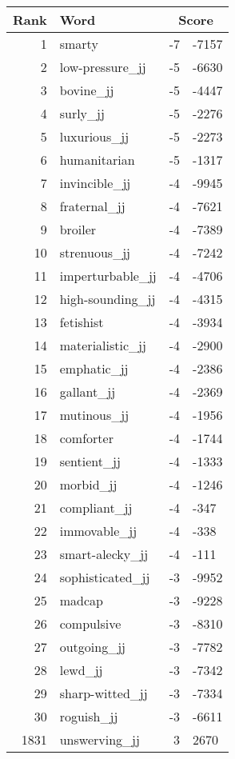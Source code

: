 \begin{longtable}[!htbp]{| rlr@{.}l |}
    \hline
    \textbf{Rank} & \textbf{Word} & \multicolumn{2}{c|}{\textbf{Score}} \\
    \hline
    \endhead
    1 & smarty & -7 & -7157 \\
    2 & low-pressure\_jj & -5 & -6630 \\
    3 & bovine\_jj & -5 & -4447 \\
    4 & surly\_jj & -5 & -2276 \\
    5 & luxurious\_jj & -5 & -2273 \\
    6 & humanitarian & -5 & -1317 \\
    7 & invincible\_jj & -4 & -9945 \\
    8 & fraternal\_jj & -4 & -7621 \\
    9 & broiler & -4 & -7389 \\
    10 & strenuous\_jj & -4 & -7242 \\
    11 & imperturbable\_jj & -4 & -4706 \\
    12 & high-sounding\_jj & -4 & -4315 \\
    13 & fetishist & -4 & -3934 \\
    14 & materialistic\_jj & -4 & -2900 \\
    15 & emphatic\_jj & -4 & -2386 \\
    16 & gallant\_jj & -4 & -2369 \\
    17 & mutinous\_jj & -4 & -1956 \\
    18 & comforter & -4 & -1744 \\
    19 & sentient\_jj & -4 & -1333 \\
    20 & morbid\_jj & -4 & -1246 \\
    21 & compliant\_jj & -4 & -347 \\
    22 & immovable\_jj & -4 & -338 \\
    23 & smart-alecky\_jj & -4 & -111 \\
    24 & sophisticated\_jj & -3 & -9952 \\
    25 & madcap & -3 & -9228 \\
    26 & compulsive & -3 & -8310 \\
    27 & outgoing\_jj & -3 & -7782 \\
    28 & lewd\_jj & -3 & -7342 \\
    29 & sharp-witted\_jj & -3 & -7334 \\
    30 & roguish\_jj & -3 & -6611 \\
    1831 & unswerving\_jj & 3 & 2670 \\

\end{longtable}
